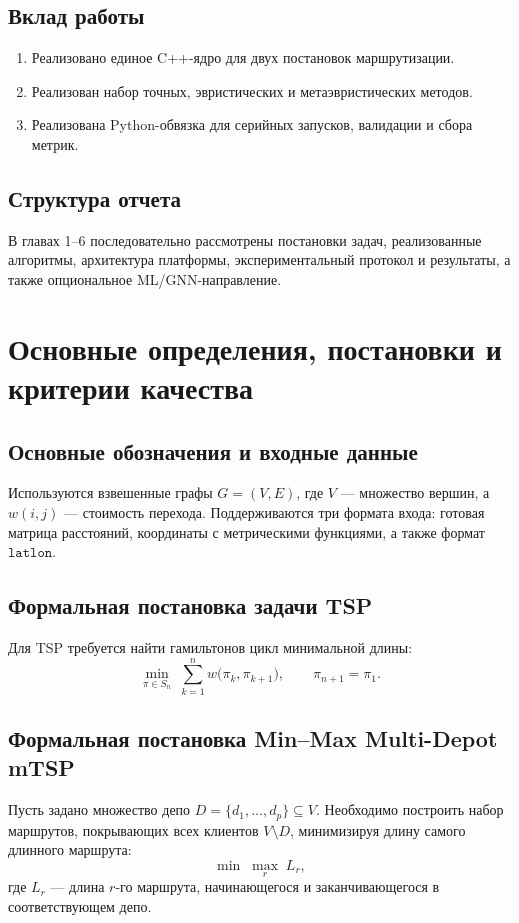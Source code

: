 \documentclass[a4paper,12pt]{extarticle}
\begin{document}
\subsection{Вклад работы}
\begin{enumerate}
    \item Реализовано единое C++-ядро для двух постановок маршрутизации.
    \item Реализован набор точных, эвристических и метаэвристических методов.
    \item Реализована Python-обвязка для серийных запусков, валидации и сбора метрик.
\end{enumerate}

\subsection{Структура отчета}
В главах 1--6 последовательно рассмотрены постановки задач, реализованные алгоритмы, архитектура платформы, экспериментальный протокол и результаты, а также опциональное ML/GNN-направление.

\pagebreak

\section{Основные определения, постановки и критерии качества}

\subsection{Основные обозначения и входные данные}
Используются взвешенные графы $G=(V,E)$, где $V$ --- множество вершин, а $w(i,j)$ --- стоимость перехода.
Поддерживаются три формата входа: готовая матрица расстояний, координаты с метрическими функциями, а также формат $\texttt{latlon}$.

\subsection{Формальная постановка задачи TSP}
Для TSP требуется найти гамильтонов цикл минимальной длины:
\begin{equation}
\label{eq:tsp_obj}
\min_{\pi \in S_n}\; \sum_{k=1}^{n} w\bigl(\pi_k,\pi_{k+1}\bigr), \qquad \pi_{n+1}=\pi_1.
\end{equation}

\subsection{Формальная постановка Min--Max Multi-Depot mTSP}
Пусть задано множество депо $D=\{d_1,\dots,d_p\}\subseteq V$.
Необходимо построить набор маршрутов, покрывающих всех клиентов $V\setminus D$, минимизируя длину самого длинного маршрута:
\begin{equation}
\label{eq:minmax_mtsp_obj}
\min\; \max_{r} \; L_r,
\end{equation}
где $L_r$ --- длина $r$-го маршрута, начинающегося и заканчивающегося в соответствующем депо.
\end{document}
